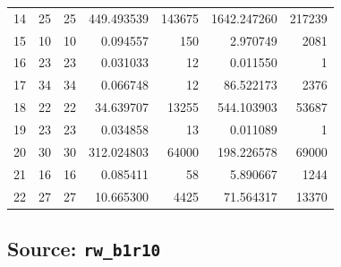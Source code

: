 \documentclass{article}
\begin{document}
\begin{landscape}
\begin{longtable}{rrrrrrr}
14 & 25 & 25 & 449.493539 & 143675 & 1642.247260 & 217239 \\
15 & 10 & 10 & 0.094557 & 150 & 2.970749 & 2081 \\
16 & 23 & 23 & 0.031033 & 12 & 0.011550 & 1 \\
17 & 34 & 34 & 0.066748 & 12 & 86.522173 & 2376 \\
18 & 22 & 22 & 34.639707 & 13255 & 544.103903 & 53687 \\
19 & 23 & 23 & 0.034858 & 13 & 0.011089 & 1 \\
20 & 30 & 30 & 312.024803 & 64000 & 198.226578 & 69000 \\
21 & 16 & 16 & 0.085411 & 58 & 5.890667 & 1244 \\
22 & 27 & 27 & 10.665300 & 4425 & 71.564317 & 13370 \\
\end{longtable}

\subsection*{Source: \texttt{rw\_b1r10}}


\end{landscape}
\end{document}
